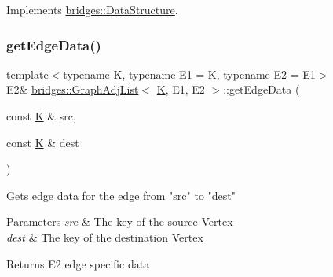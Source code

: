 Implements \mbox{\hyperlink{classbridges_1_1_data_structure_a957a63b106e340bc753620c650632bdc}{bridges\+::\+Data\+Structure}}.

\mbox{\label{classbridges_1_1_graph_adj_list_a3e4b21d0ff4b277502b2bb10e57df3c7}} 
\subsubsection{\texorpdfstring{getEdgeData()}{getEdgeData()}\hspace{0.1cm}{\footnotesize\ttfamily [1/2]}}
{\footnotesize\ttfamily template$<$typename K, typename E1 = K, typename E2 = E1$>$ \\
E2\& \mbox{\hyperlink{classbridges_1_1_graph_adj_list}{bridges\+::\+Graph\+Adj\+List}}$<$ \mbox{\hyperlink{namespacebridges_acfb0a4f7877d8f63de3e6862004c50edaa5f3c6a11b03839d46af9fb43c97c188}{K}}, E1, E2 $>$\+::get\+Edge\+Data (\begin{DoxyParamCaption}\item[{const \mbox{\hyperlink{namespacebridges_acfb0a4f7877d8f63de3e6862004c50edaa5f3c6a11b03839d46af9fb43c97c188}{K}} \&}]{src,  }\item[{const \mbox{\hyperlink{namespacebridges_acfb0a4f7877d8f63de3e6862004c50edaa5f3c6a11b03839d46af9fb43c97c188}{K}} \&}]{dest }\end{DoxyParamCaption})\hspace{0.3cm}{\ttfamily [inline]}}

\begin{DoxyVerb}Gets edge data for the edge from "src" to "dest"
\end{DoxyVerb}



\begin{DoxyParams}{Parameters}
{\em src} & The key of the source Vertex \\
\hline
{\em dest} & The key of the destination Vertex\\
\hline
\end{DoxyParams}
\begin{DoxyReturn}{Returns}
E2 edge specific data 
\end{DoxyReturn}
\mbox{\label{classbridges_1_1_graph_adj_list_af1a762dd4bdc60cf80251df173f2a683}} 
